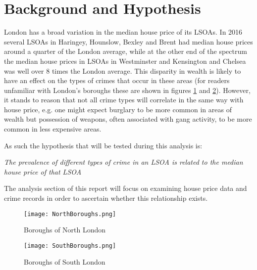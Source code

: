 \documentclass{article}
\begin{document}
\newpage
\section{Background and Hypothesis} \label{Background and Hypothesis}

London has a broad variation in the median house price of its LSOAs. In 2016 several LSOAs in Haringey, Hounslow, Bexley and Brent had median house prices around a quarter of the London average, while at the other end of the spectrum the median house prices in LSOAs in Westminster and Kensington and Chelsea was well over 8 times the London average. This disparity in wealth is likely to have an effect on the types of crimes that occur in these areas (for readers unfamiliar with London's boroughs these are shown in figures \ref{fig:NorthBoroughs} and \ref{fig:SouthBoroughs}). However, it stands to reason that not all crime types will correlate in the same way with house price, e.g. one might expect burglary to be more common in areas of wealth but possession of weapons, often associated with gang activity, to be more common in less expensive areas.
\newline

As such the hypothesis that will be tested during this analysis is:
\newline

\textit{The prevalence of different types of crime in an LSOA is related to the median house price of that LSOA}
\newline

The analysis section of this report will focus on examining house price data and crime records in order to ascertain whether this relationship exists.

\begin{figure}[H]
\begin{center}
  \texttt{[image: NorthBoroughs.png]}
  \caption{Boroughs of North London}
  \label{fig:NorthBoroughs}
\end{center}
\end{figure}

\begin{figure}[H]
\begin{center}
  \texttt{[image: SouthBoroughs.png]}
  \caption{Boroughs of South London}
  \label{fig:SouthBoroughs}
\end{center}
\end{figure}
\end{document}
